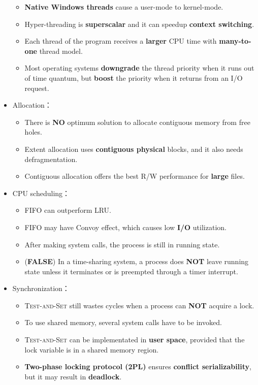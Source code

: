 \begin{itemize}
\begin{itemize}
        \item \textbf{Native Windows threads} cause a user-mode to kernel-mode.
        \item Hyper-threading is \textbf{superscalar} and it can speedup \textbf{context switching}.
        \item Each thread of the program receives a \textbf{larger} CPU time with \textbf{many-to-one} thread model.
        \item Most operating systems \textbf{downgrade} the thread priority when it runs out of time quantum, but \textbf{boost} the priority when it returns from an I/O request.
    \end{itemize}
    \item Allocation： \begin{itemize}
        \item There is \textbf{NO} optimum solution to allocate contiguous memory from free holes.
        \item Extent allocation uses \textbf{contiguous physical} blocks, and it also needs defragmentation.
        \item Contiguous allocation offers the best R/W performance for \textbf{large} files.
    \end{itemize}
    \item CPU scheduling： \begin{itemize}
        \item FIFO can outperform LRU.
        \item FIFO may have Convoy effect, which causes low \textbf{I/O} utilization.
        \item After making system calls, the process is still in running state.
        \item (\textbf{FALSE}) In a time-sharing system, a process does \textbf{NOT} leave running state unless it terminates or is preempted through a timer interrupt. 
    \end{itemize}
    \item Synchronization： \begin{itemize}
        \item \textsc{Test-and-Set} still wastes cycles when a process can \textbf{NOT} acquire a lock. 
        \item To use shared memory, several system calls have to be invoked.
        \item \textsc{Test-and-Set} can be implementated in \textbf{user space}, provided that the lock variable is in a shared memory region.
        \item \textbf{Two-phase locking protocol (2PL)} ensures \textbf{conflict serializability}, but it may result in \textbf{deadlock}.

\end{itemize}
\end{itemize}
